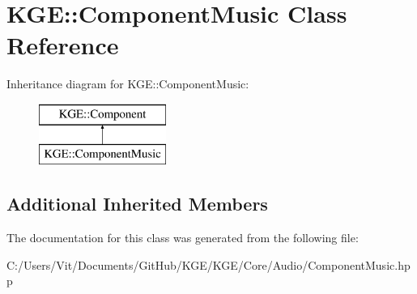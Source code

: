 \hypertarget{class_k_g_e_1_1_component_music}{\section{K\-G\-E\-:\-:Component\-Music Class Reference}
\label{class_k_g_e_1_1_component_music}
}
Inheritance diagram for K\-G\-E\-:\-:Component\-Music\-:\begin{figure}[H]
\begin{center}
\leavevmode
\includegraphics[height=2.000000cm]{class_k_g_e_1_1_component_music}
\end{center}
\end{figure}
\subsection*{Additional Inherited Members}


The documentation for this class was generated from the following file\-:\begin{DoxyCompactItemize}
\item 
C\-:/\-Users/\-Vit/\-Documents/\-Git\-Hub/\-K\-G\-E/\-K\-G\-E/\-Core/\-Audio/Component\-Music.\-hpp\end{DoxyCompactItemize}
